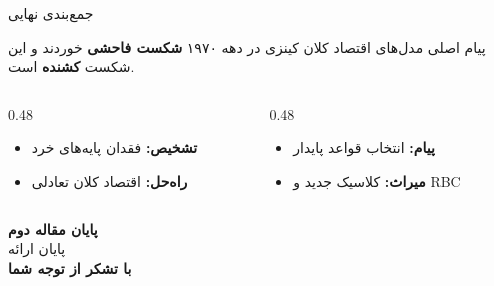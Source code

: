 \documentclass[aspectratio=169,11pt]{beamer}
\newcommand{\important}[1]{\textcolor{AlertRed}{\textbf{#1}}}
\newcommand{\keyword}[1]{\textcolor{MainBlue}{\textbf{#1}}}
\begin{document}
\begin{frame}{جمع‌بندی نهایی}
	\begin{block}{پیام اصلی}
		\centering
		\large
		مدل‌های اقتصاد کلان کینزی در دهه ۱۹۷۰ \important{شکست فاحشی} خوردند و این شکست \important{کشنده} است.
	\end{block}
	\vspace{0.5cm}
	\begin{LTR}
		\begin{columns}[T]
			\begin{column}{0.48\textwidth}
				\begin{RTL}
					\begin{itemize}
						\item \keyword{تشخیص:} فقدان پایه‌های خرد
						\item \keyword{راه‌حل:} اقتصاد کلان تعادلی
					\end{itemize}
				\end{RTL}
			\end{column}
			\hfill
			\begin{column}{0.48\textwidth}
				\begin{RTL}
					\begin{itemize}
						\item \keyword{پیام:} انتخاب قواعد پایدار
						\item \keyword{میراث:} کلاسیک جدید و RBC
					\end{itemize}
				\end{RTL}
			\end{column}
		\end{columns}
	\end{LTR}
\end{frame}

{
	\begin{frame}[plain]
		\centering
		\vspace{1.5cm}
		{\color{white}\Huge\bfseries پایان مقاله دوم}\\[0.8cm]
		{\color{white}\large پایان ارائه}\\[0.5cm]
		{\color{AccentOrange}\Large\bfseries با تشکر از توجه شما}
	\end{frame}
}
\end{document}
